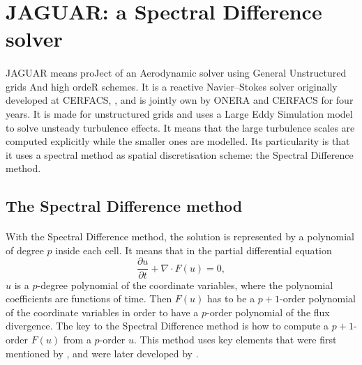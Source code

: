   \section{JAGUAR: a Spectral Difference solver}

    \paragraph{}
    JAGUAR means proJect of an Aerodynamic solver using General Unstructured grids And high ordeR schemes.
    It is a reactive Navier--Stokes solver originally developed at CERFACS, , and is jointly own by ONERA and CERFACS for four years.
    It is made for unstructured grids and uses a Large Eddy Simulation model to solve unsteady turbulence effects.
    It means that the large turbulence scales are computed explicitly while the smaller ones are modelled.
    Its particularity is that it uses a spectral method as spatial discretisation scheme: the Spectral Difference method.


    \subsection{The Spectral Difference method}

      \paragraph{}
      With the Spectral Difference method, the solution is represented by a polynomial of degree $p$ inside each cell.
      It means that in the partial differential equation
      \begin{equation}\label{eq:pde_2}
        \frac{\partial u}{\partial t} + \nabla \cdot F\left(u\right) = 0 ,
      \end{equation}
      $u$ is a $p$-degree polynomial of the coordinate variables, where the polynomial coefficients are functions of time.
      Then $F\left(u\right)$ has to be a $p\!+\!1$-order polynomial of the coordinate variables in order to have a $p$-order polynomial of the flux divergence.
      The key to the Spectral Difference method is how to compute a $p + 1$-order $F\left(u\right)$ from a $p$-order $u$.
      This method uses key elements that were first mentioned by \cite{Kopriva1996}, and were later developed by \cite{LiuVinokurWang2006}.

